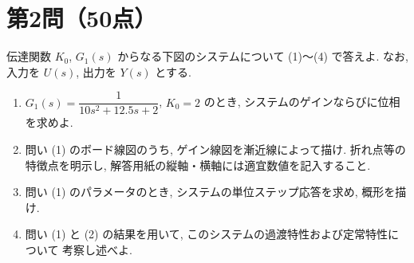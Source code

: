 
\section*{第2問（50点）}

伝達関数 $K_0$, $G_1(s)$ からなる下図のシステムについて (1)〜(4) で答えよ.
なお, 入力を $U(s)$, 出力を $Y(s)$ とする.

\begin{center}
\end{center}

\begin{enumerate}[label=(\arabic*)]
  \item $G_1(s)=\dfrac{1}{10s^{2}+12.5s+2}$, $K_0=2$ のとき,
        システムのゲインならびに位相を求めよ.

  \item 問い (1) のボード線図のうち, ゲイン線図を漸近線によって描け.
        折れ点等の特徴点を明示し, 解答用紙の縦軸・横軸には適宜数値を記入すること.

  \item 問い (1) のパラメータのとき, システムの単位ステップ応答を求め, 概形を描け.

  \item 問い (1) と (2) の結果を用いて, このシステムの過渡特性および定常特性について
        考察し述べよ.
\end{enumerate}
